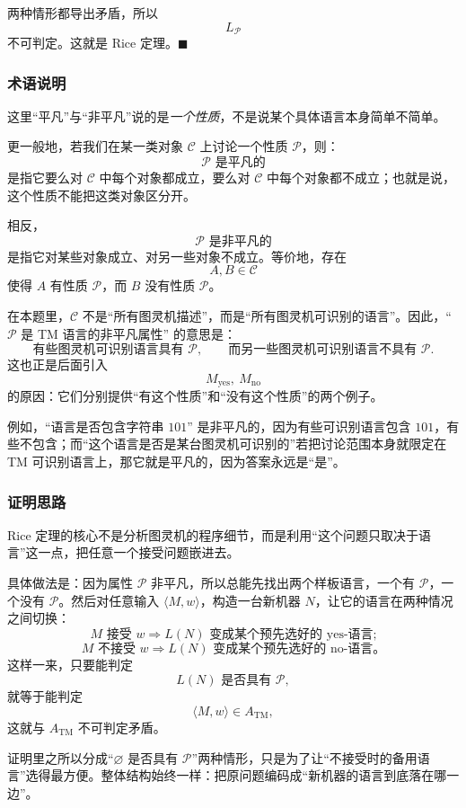\begin{answerred}
两种情形都导出矛盾，所以
\[
L_{\mathcal{P}}
\]
不可判定。这就是 Rice 定理。$\blacksquare$

\subsubsection*{术语说明}

这里“平凡”与“非平凡”说的是\emph{一个性质}，不是说某个具体语言本身简单不简单。

更一般地，若我们在某一类对象 $\mathcal{C}$ 上讨论一个性质 $\mathcal{P}$，则：
\[
\mathcal{P}\text{ 是平凡的}
\]
是指它要么对 $\mathcal{C}$ 中每个对象都成立，要么对 $\mathcal{C}$ 中每个对象都不成立；也就是说，这个性质不能把这类对象区分开。

相反，
\[
\mathcal{P}\text{ 是非平凡的}
\]
是指它对某些对象成立、对另一些对象不成立。等价地，存在
\[
A,B\in\mathcal{C}
\]
使得 $A$ 有性质 $\mathcal{P}$，而 $B$ 没有性质 $\mathcal{P}$。

在本题里，$\mathcal{C}$ 不是“所有图灵机描述”，而是“所有图灵机可识别的语言”。因此，“$\mathcal{P}$ 是 TM 语言的非平凡属性” 的意思是：
\[
\text{有些图灵机可识别语言具有 }\mathcal{P},
\qquad
\text{而另一些图灵机可识别语言不具有 }\mathcal{P}.
\]
这也正是后面引入
\[
M_{\mathrm{yes}},\ M_{\mathrm{no}}
\]
的原因：它们分别提供“有这个性质”和“没有这个性质”的两个例子。

例如，“语言是否包含字符串 $101$” 是非平凡的，因为有些可识别语言包含 $101$，有些不包含；而“这个语言是否是某台图灵机可识别的”若把讨论范围本身就限定在 TM 可识别语言上，那它就是平凡的，因为答案永远是“是”。

\subsubsection*{证明思路}

Rice 定理的核心不是分析图灵机的程序细节，而是利用“这个问题只取决于语言”这一点，把任意一个接受问题嵌进去。

具体做法是：因为属性 $\mathcal{P}$ 非平凡，所以总能先找出两个样板语言，一个有 $\mathcal{P}$，一个没有 $\mathcal{P}$。然后对任意输入 $\langle M,w\rangle$，构造一台新机器 $N$，让它的语言在两种情况之间切换：
\[
M\text{ 接受 }w
\Rightarrow
L(N)\text{ 变成某个预先选好的 yes-语言;}
\]
\[
M\text{ 不接受 }w
\Rightarrow
L(N)\text{ 变成某个预先选好的 no-语言。}
\]
这样一来，只要能判定
\[
L(N)\text{ 是否具有 }\mathcal{P},
\]
就等于能判定
\[
\langle M,w\rangle\in A_{\mathrm{TM}},
\]
这就与 $A_{\mathrm{TM}}$ 不可判定矛盾。

证明里之所以分成“$\varnothing$ 是否具有 $\mathcal{P}$”两种情形，只是为了让“不接受时的备用语言”选得最方便。整体结构始终一样：把原问题编码成“新机器的语言到底落在哪一边”。 

\end{answerred}
